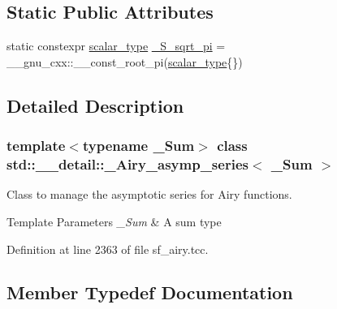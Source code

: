 \subsection*{Static Public Attributes}
\begin{DoxyCompactItemize}
\item 
static constexpr \hyperlink{classstd_1_1____detail_1_1__Airy__asymp__series_ac2d0fa6d86d7a83c06dca057d0dfec3a}{scalar\+\_\+type} \hyperlink{classstd_1_1____detail_1_1__Airy__asymp__series_a0a4d017f86429e22f5939e689e7b93ca}{\+\_\+\+S\+\_\+sqrt\+\_\+pi} = \+\_\+\+\_\+gnu\+\_\+cxx\+::\+\_\+\+\_\+const\+\_\+root\+\_\+pi(\hyperlink{classstd_1_1____detail_1_1__Airy__asymp__series_ac2d0fa6d86d7a83c06dca057d0dfec3a}{scalar\+\_\+type}\{\})
\end{DoxyCompactItemize}


\subsection{Detailed Description}
\subsubsection*{template$<$typename \+\_\+\+Sum$>$\newline
class std\+::\+\_\+\+\_\+detail\+::\+\_\+\+Airy\+\_\+asymp\+\_\+series$<$ \+\_\+\+Sum $>$}

Class to manage the asymptotic series for Airy functions.


\begin{DoxyTemplParams}{Template Parameters}
{\em \+\_\+\+Sum} & A sum type \\
\hline
\end{DoxyTemplParams}


Definition at line 2363 of file sf\+\_\+airy.\+tcc.



\subsection{Member Typedef Documentation}
\mbox{\label{classstd_1_1____detail_1_1__Airy__asymp__series_ac2d0fa6d86d7a83c06dca057d0dfec3a}} 
